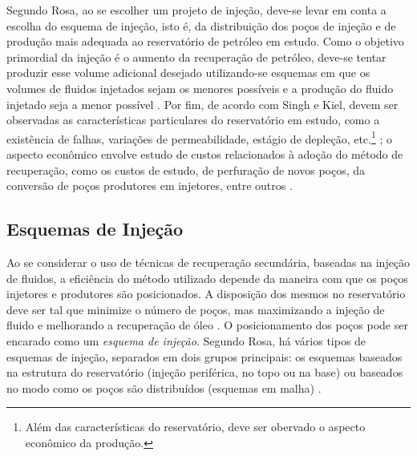 Segundo Rosa, ao se escolher um projeto de inje\c{c}\~{a}o, deve-se levar em conta a escolha do esquema de inje\c{c}\~{a}o, isto \'{e}, da distribui\c{c}\~{a}o dos po\c{c}os de inje\c{c}\~{a}o e de produ\c{c}\~{a}o mais adequada ao reservat\'{o}rio de petr\'{o}leo em estudo. Como o objetivo primordial da inje\c{c}\~{a}o \'{e} o aumento da recupera\c{c}\~{a}o de petr\'{o}leo, deve-se tentar produzir esse volume adicional desejado utilizando-se esquemas em que os volumes de fluidos injetados sejam os menores poss\'{i}veis e a produ\c{c}\~{a}o do fluido injetado seja a menor poss\'{i}vel \cite{engpetro}. Por fim, de acordo com Singh e Kiel, devem ser observadas as caracter\'{i}sticas particulares do reservat\'{o}rio em estudo, como a exist\^{e}ncia de falhas, varia\c{c}\~{o}es de permeabilidade, est\'{a}gio de deple\c{c}\~{a}o, etc.\footnote{Al\'{e}m das caracter\'{i}sticas do reservat\'{o}rio, deve ser obervado o aspecto econ\^{o}mico da produ\c{c}\~{a}o.} \cite{singh1982}; o aspecto econ\^{o}mico envolve estudo de custos relacionados \`{a} ado\c{c}\~{a}o do m\'{e}todo de recupera\c{c}\~{a}o, como os custos de estudo, de perfura\c{c}\~{a}o de novos po\c{c}os, da convers\~{a}o de po\c{c}os produtores em injetores, entre outros \cite{latil}.


\subsection{Esquemas de Inje\c{c}\~{a}o}

Ao se considerar o uso de t\'{e}cnicas de recupera\c{c}\~{a}o secund\'{a}ria, baseadas na inje\c{c}\~{a}o de fluidos, a efici\^{e}ncia do m\'{e}todo utilizado depende da maneira com que os po\c{c}os injetores e produtores s\~{a}o posicionados. A disposi\c{c}\~{a}o dos mesmos no reservat\'{o}rio deve ser tal que minimize o n\'{u}mero de po\c{c}os, mas maximizando a inje\c{c}\~{a}o de fluido e melhorando a recupera\c{c}\~{a}o de \'{o}leo \cite{dake}. O posicionamento dos po\c{c}os pode ser encarado como um \textit{esquema de inje\c{c}\~{a}o}. Segundo Rosa, h\'{a} v\'{a}rios tipos de esquemas de inje\c{c}\~{a}o, separados em dois grupos principais: os esquemas baseados na estrutura do reservat\'{o}rio (inje\c{c}\~{a}o perif\'{e}rica, no topo ou na base) ou baseados no modo como os po\c{c}os s\~{a}o distribu\'{i}dos (esquemas em malha) \cite[p. 564]{engres}.

